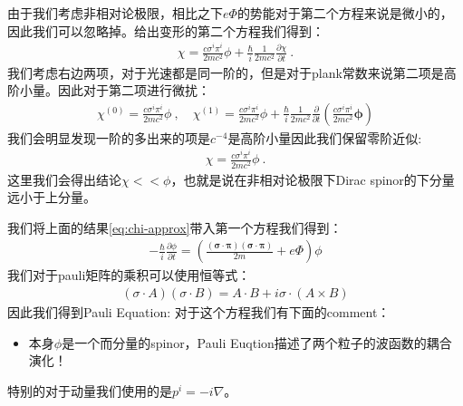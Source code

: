 \bigskip
{}

由于我们考虑非相对论极限，相比之下$ e \Phi $的势能对于第二个方程来说是微小的，因此我们可以忽略掉。给出变形的第二个方程我们得到：
\begin{align}
  \chi=\frac{c\sigma^i \pi^i
  }{2mc^2}\phi+\frac{\hbar}{i}\frac{1}{2mc^2}\frac{\partial\chi}{\partial
  t}\mathrm{~.}
\end{align}
我们考虑右边两项，对于光速都是同一阶的，但是对于plank常数来说第二项是高阶小量。因此对于第二项进行微扰：
\begin{align}
  \chi^{(0)}=\frac{c\sigma^i \pi^i}{2mc^2}\phi\mathrm{~,} \quad
  \chi^{(1)}=\frac{c\sigma^i \pi^i}{2mc^2}\phi +
  \frac{\hbar}{i}\frac{1}{2mc^2}\frac{\partial}{\partial
  t}\left(\frac{c\sigma^i \pi^i}{2mc^2}\boldsymbol{\phi}\right)
\end{align}
我们会明显发现一阶的多出来的项是$ c^{-4} $是高阶小量因此我们保留零阶近似:
\begin{align}\label{eq:chi-approx}
  \chi = \frac{c\sigma^i \pi^i}{2mc^2}\phi\mathrm{~.}
\end{align}
这里我们会得出结论$ \chi << \phi $，也就是说在非相对论极限下Dirac spinor的下分量远小于上分量。

\bigskip
{}

我们将上面的结果\cref{eq:chi-approx}带入第一个方程我们得到：
\begin{align}
  -\frac{\hbar}{i}\frac{\partial\phi}{\partial
  t}=\left(\frac{(\mathbf{\sigma} \cdot \mathbf{\pi})(\mathbf{\sigma}
  \cdot \mathbf{\pi})}{2m}+e\Phi\right) \phi
\end{align}
我们对于pauli矩阵的乘积可以使用恒等式：
\begin{align}
  (\sigma \cdot A)(\sigma \cdot B) = A \cdot B + i \sigma \cdot (A \times B)
\end{align}
因此我们得到Pauli Equation:
对于这个方程我们有下面的comment：
\begin{itemize}
  \item 本身$ \phi $是一个而分量的spinor，Pauli Euqtion描述了两个粒子的波函数的耦合演化！
\end{itemize}
特别的对于动量我们使用的是$ p^i = - i \nabla $。
